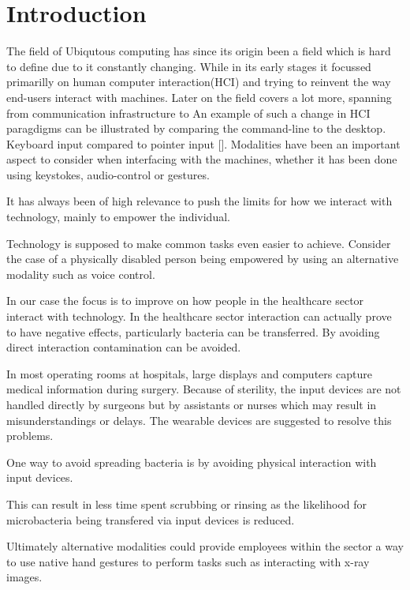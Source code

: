 \section{Introduction}
The field of Ubiqutous computing has since its origin been a field which is hard to define due to it constantly changing.
While in its early stages it focussed primarilly on human computer interaction(HCI) 
and trying to reinvent the way end-users interact with machines.
Later on the field covers a lot more, spanning from communication infrastructure to 
An example of such a change in HCI paragdigms can be illustrated by comparing the command-line to the desktop. Keyboard input compared to pointer input [\cite{}].
Modalities have been an important aspect
to consider when interfacing with the machines, whether it has been done using keystokes, audio-control or gestures.

It has always been of high relevance to push the limits for how we interact with technology, mainly to empower the individual.

Technology is supposed to make common tasks even easier to achieve. Consider the case of a physically disabled person being empowered by using an alternative modality such as voice control.

In our case the focus is to improve on how people in the healthcare sector interact with technology.
In the healthcare sector interaction can actually prove to have negative effects, particularly bacteria can be transferred.
By avoiding direct interaction contamination can be avoided.

In most operating rooms at hospitals, large displays and computers capture medical information during surgery.
Because of sterility, the input devices are not handled directly by surgeons but by assistants or nurses which may result in misunderstandings or delays\cite{Pederson:2015}.
The wearable devices are suggested to resolve this problems.

One way to avoid spreading bacteria is by avoiding physical interaction with input devices.

This can result in less time spent scrubbing or rinsing as the likelihood for microbacteria being 
transfered via input devices is reduced.


Ultimately alternative modalities could provide employees within the sector a 
way to use native hand gestures to perform tasks such as interacting with x-ray images.
